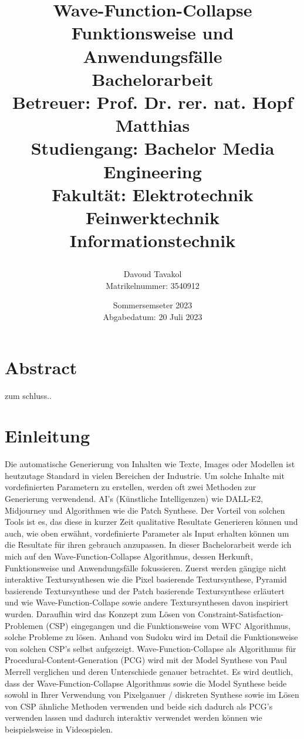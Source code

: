 \documentclass[12pt, a4paper,twoside,openright]{report}
\title{
{\huge Wave-Function-Collapse}\\
{\large Funktionsweise und Anwendungsfälle}\\
{\vspace{10mm}}
{\large Bachelorarbeit}\\
{\large Betreuer: Prof. Dr. rer. nat. Hopf Matthias}\\
{\vspace{10mm}}
{\large Studiengang: Bachelor Media Engineering}\\
{\large Fakultät: Elektrotechnik Feinwerktechnik Informationstechnik}\\

\author{
    Davoud Tavakol \\ Matrikelnummer: 3540912
}
\date{Sommersemseter 2023 \\ Abgabedatum: 20 Juli 2023}
}
\begin{document}
\maketitle



{\let\clearpage\relax\chapter*{Abstract}}

zum schluss..

\tableofcontents

\chapter{Einleitung}

Die automatische Generierung von Inhalten wie Texte, Images oder Modellen ist heutzutage Standard in vielen Bereichen der Industrie.
Um solche Inhalte mit vordefinierten Parametern zu erstellen, werden oft zwei Methoden zur Generierung verwendend.
AI's {(Künstliche Intelligenzen)} wie DALL-E2, Midjourney und Algorithmen wie die Patch Synthese.
Der Vorteil von solchen Tools ist es, das diese in kurzer Zeit qualitative Resultate Generieren können und auch, wie oben erwähnt, vordefinierte Parameter als Input erhalten können
um die Resultate für ihren gebrauch anzupassen.
In dieser Bachelorarbeit werde ich mich auf den Wave-Function-Collapse Algorithmus, dessen Herkunft, Funktionsweise und Anwendungsfälle fokussieren.
Zuerst werden gängige nicht interaktive Textursynthesen wie die Pixel basierende Textursynthese, Pyramid basierende Textursynthese und der Patch basierende Textursynthese erläutert
und wie Wave-Function-Collape sowie andere Textursynthesen davon inspiriert wurden.
Daraufhin wird das Konzept zum Lösen von Constraint-Satisfaction-Problemen {(CSP)} eingegangen und die Funktionsweise vom WFC Algorithmus, solche Probleme zu lösen.
Anhand von Sudoku wird im Detail die Funktionsweise von solchen CSP's selbst aufgezeigt.
Wave-Function-Collapse als Algorithmus für Procedural-Content-Generation {(PCG)} wird mit der Model Synthese von Paul Merrell verglichen und deren Unterschiede genauer betrachtet.
Es wird deutlich, dass der Wave-Function-Collapse Algorithmus sowie die Model Synthese beide sowohl in Ihrer Verwendung von Pixelganuer / diskreten Synthese sowie im Lösen von
CSP ähnliche Methoden verwenden und beide sich dadurch als PCG's verwenden lassen und dadurch interaktiv verwendet werden können wie beispielsweise in Videospielen.
\end{document}
